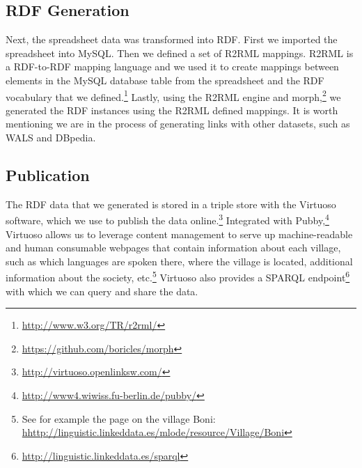 \subsection{RDF Generation}
Next, the spreadsheet data was transformed into RDF. First we imported the spreadsheet into MySQL. Then we defined a set of R2RML mappings. R2RML is a RDF-to-RDF mapping language and we used it to create mappings between elements in the MySQL database table from the spreadsheet and the RDF vocabulary that we defined.\footnote{\url{http://www.w3.org/TR/r2rml/}} Lastly, using the R2RML engine and morph,\footnote{\url{https://github.com/boricles/morph}} we generated the RDF instances using the R2RML defined mappings. It is worth mentioning we are in the process of generating links with other datasets, such as WALS and DBpedia.

\subsection{Publication}\label{sec:pub}
The RDF data that we generated is stored in a triple store with the Virtuoso software, which we use to publish the data online.\footnote{\url{http://virtuoso.openlinksw.com/}} Integrated with Pubby,\footnote{\url{http://www4.wiwiss.fu-berlin.de/pubby/}} Virtuoso allows us to leverage content management to serve up machine-readable and human consumable webpages that contain information about each village, such as which languages are spoken there, where the village is located, additional information about the society, etc.\footnote{See for example the page on the village Boni: \url{hhttp://linguistic.linkeddata.es/mlode/resource/Village/Boni}} Virtuoso also provides a SPARQL endpoint\footnote{\url{http://linguistic.linkeddata.es/sparql}} with which we can query and share the data.


